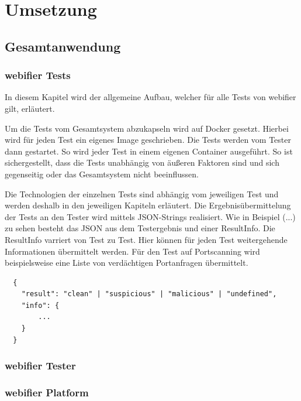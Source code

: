 \chapter{Umsetzung}

\section{Gesamtanwendung}


\subsection{webifier Tests}
In diesem Kapitel wird der allgemeine Aufbau, welcher für alle Tests von webifier gilt, erläutert.

Um die Tests vom Gesamtsystem abzukapseln wird auf Docker gesetzt. Hierbei wird für jeden Test ein eigenes Image geschrieben. Die Tests werden vom Tester dann gestartet. So wird jeder Test in einem eigenen Container ausgeführt. So ist sichergestellt, dass die Tests unabhängig von äußeren Faktoren sind und sich gegenseitig oder das Gesamtsystem nicht beeinflussen.

Die Technologien der einzelnen Tests sind abhängig vom jeweiligen Test und werden deshalb in den jeweiligen Kapiteln erläutert. Die Ergebnisübermittelung der Tests an den Tester wird mittels JSON-Strings realisiert. Wie in Beispiel (...) zu sehen besteht das JSON aus dem Testergebnis und einer ResultInfo. Die ResultInfo varriert von Test zu Test. Hier können für jeden Test weitergehende Informationen übermittelt werden. Für den Test auf Portscanning wird beispielsweise eine Liste von verdächtigen Portanfragen übermittelt.
\begin{scriptsize}
\begin{lstlisting}
  {
  	"result": "clean" | "suspicious" | "malicious" | "undefined",
  	"info": {
  		...
  	}
  }
\end{lstlisting}
\end{scriptsize}

\subsection{webifier Tester}


\subsection{webifier Platform}

